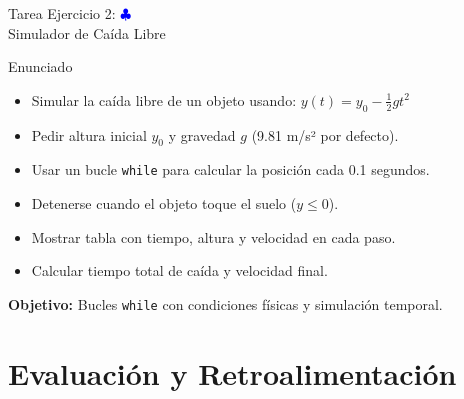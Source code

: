 \documentclass[10pt]{beamer}
\begin{document}
\begin{frame}{Tarea Ejercicio 2: \hfill \textcolor{blue}{$\clubsuit$} \\ Simulador de Caída Libre}
  \begin{block}{Enunciado}
    \begin{itemize}
      \item Simular la caída libre de un objeto usando: \(y(t) = y_0 - \frac{1}{2}gt^2\)
      \item Pedir altura inicial \(y_0\) y gravedad \(g\) (9.81 m/s² por defecto).
      \item Usar un bucle \texttt{while} para calcular la posición cada 0.1 segundos.
      \item Detenerse cuando el objeto toque el suelo (\(y \leq 0\)).
      \item Mostrar tabla con tiempo, altura y velocidad en cada paso.
      \item Calcular tiempo total de caída y velocidad final.
    \end{itemize}
  \end{block}
  
  \textbf{Objetivo:} Bucles \texttt{while} con condiciones físicas y simulación temporal.
\end{frame}



\section{Evaluación y Retroalimentación}
\end{document}
